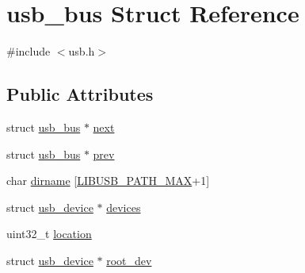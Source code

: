 \hypertarget{structusb__bus}{\section{usb\-\_\-bus Struct Reference}
\label{structusb__bus}
}


{\ttfamily \#include $<$usb.\-h$>$}

\subsection*{Public Attributes}
\begin{DoxyCompactItemize}
\item 
struct \hyperlink{structusb__bus}{usb\-\_\-bus} $\ast$ \hyperlink{structusb__bus_a688dc9ee89ff98b6ec86813efee8fa85}{next}
\item 
struct \hyperlink{structusb__bus}{usb\-\_\-bus} $\ast$ \hyperlink{structusb__bus_a02d6ed8e783c4f40cf990196595be62a}{prev}
\item 
char \hyperlink{structusb__bus_ae8b9f78fe9afce6fa6d682f85f3980f8}{dirname} \mbox{[}\hyperlink{usb_8h_a927364bf724921dbce110225b861b900}{L\-I\-B\-U\-S\-B\-\_\-\-P\-A\-T\-H\-\_\-\-M\-A\-X}+1\mbox{]}
\item 
struct \hyperlink{structusb__device}{usb\-\_\-device} $\ast$ \hyperlink{structusb__bus_ac36d0add02d389f3ae15e5cade08b4b4}{devices}
\item 
uint32\-\_\-t \hyperlink{structusb__bus_ac15a6a9382eeb4a552abb3931cf88170}{location}
\item 
struct \hyperlink{structusb__device}{usb\-\_\-device} $\ast$ \hyperlink{structusb__bus_ac7723cca14365fb0955e8f13fb4fdb55}{root\-\_\-dev}
\end{DoxyCompactItemize}


